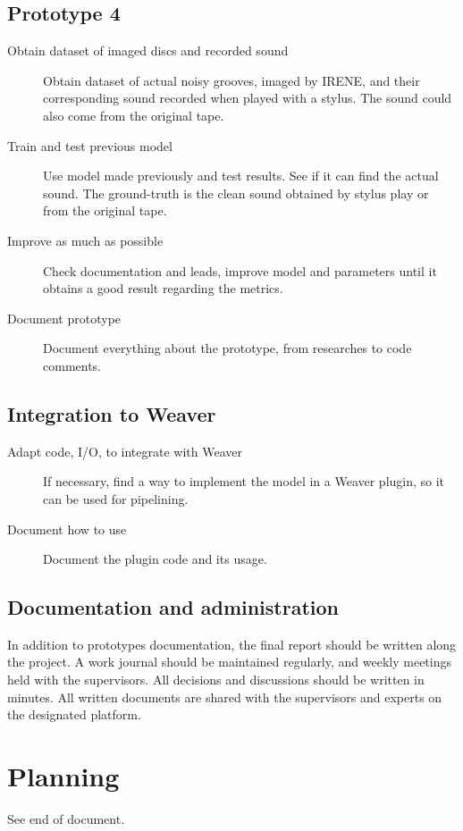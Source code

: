 \documentclass[12pt, twoside]{article}
\begin{document}
\subsection{Prototype 4}
\begin{description}
    \item[Obtain dataset of imaged discs and recorded sound] Obtain dataset of actual noisy grooves, imaged by IRENE, and their corresponding sound recorded when played with a stylus. The sound could also come from the original tape.
    \item[Train and test previous model] Use model made previously and test results. See if it can find the actual sound. The ground-truth is the clean sound obtained by stylus play or from the original tape.
    \item[Improve as much as possible] Check documentation and leads, improve model and parameters until it obtains a good result regarding the metrics.
    \item[Document prototype] Document everything about the prototype, from researches to code comments. 
\end{description}
\subsection{Integration to Weaver}
\begin{description}
	\item[Adapt code, I/O, to integrate with Weaver] If necessary, find a way to implement the model in a Weaver plugin, so it can be used for pipelining.
	\item[Document how to use] Document the plugin code and its usage.
\end{description}
\subsection{Documentation and administration}
In addition to prototypes documentation, the final report should be written along the project. A work journal should be maintained regularly, and weekly meetings held with the supervisors. All decisions and discussions should be written in minutes. All written documents are shared with the supervisors and experts on the designated platform.

\section{Planning}
See end of document.



\end{document}
